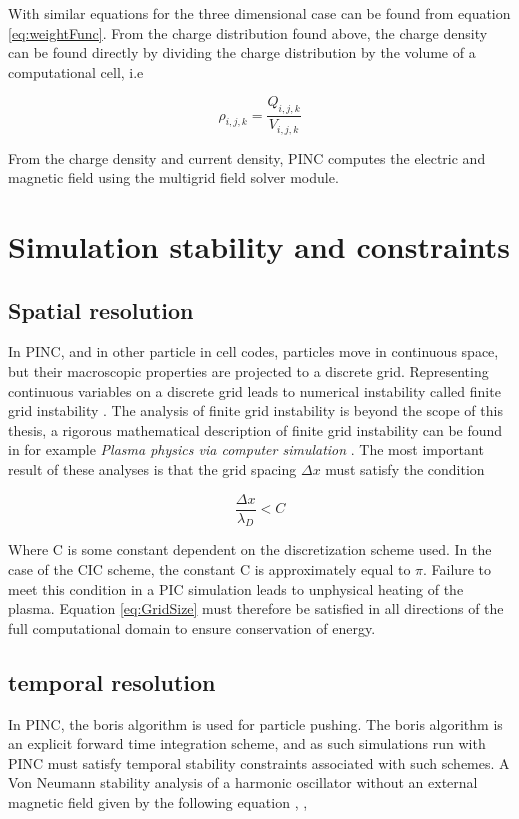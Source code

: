 With similar equations for the three dimensional case can be found from equation \eqref{eq:weightFunc}. From the charge distribution found above, the charge density can be found directly by dividing the charge distribution by the volume of a computational cell, i.e 

\begin{equation*}
    \rho_{i,j,k} = \frac{Q_{i,j,k}}{V_{i,j,k}}
\end{equation*}

From the charge density and current density, PINC computes the electric and magnetic field using the multigrid field solver module.

\section{Simulation stability and constraints}

\subsection{Spatial resolution}
In PINC, and in other particle in cell codes, particles move in continuous space, but their macroscopic properties are projected to a discrete grid. Representing continuous variables on a discrete grid leads to numerical instability called finite grid instability \parencite[section 5.1.]{Lapenta2011}. The analysis of finite grid instability is beyond the scope of this thesis, a rigorous mathematical description of finite grid instability can be found in for example \textit{Plasma physics via computer simulation} \parencite{Birdsall2004}. The most important result of these analyses is that the grid spacing $\Delta x$ must satisfy the condition

\begin{equation}\label{eq:GridSize}
    \frac{\Delta x}{\lambda_D} < C
\end{equation}


Where C is some constant dependent on the discretization scheme used. In the case of the CIC scheme, the constant C is approximately equal to $\pi$. Failure to meet this condition in a PIC simulation leads to unphysical heating of the plasma. Equation \eqref{eq:GridSize} must therefore be satisfied in all directions of the full computational domain to ensure conservation of energy.

\subsection{temporal resolution}
In PINC, the boris algorithm is used for particle pushing. The boris algorithm is an explicit forward time integration scheme, and as such simulations run with PINC must satisfy temporal stability constraints associated with such schemes. A Von Neumann stability analysis of a harmonic oscillator without an external magnetic field given by the following equation \parencite{Hockney1988}, \parencite{Birdsall2004}, \parencite{Lapenta2011} 

